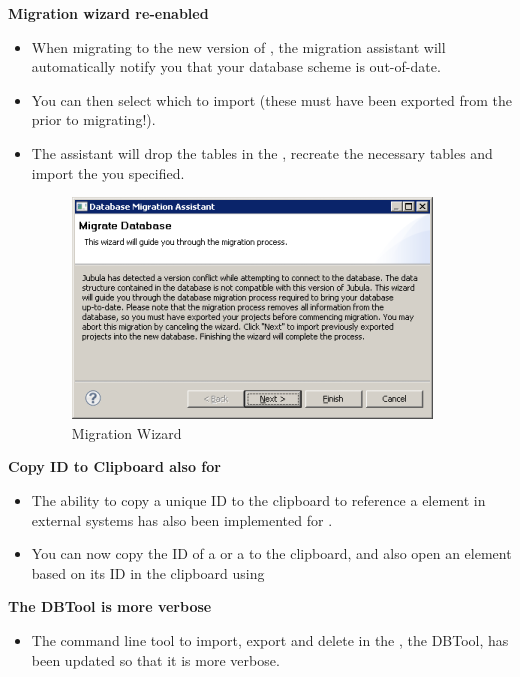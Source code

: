 \textbf{Migration wizard re-enabled}
\begin{itemize}
\item  When migrating to the new version of \app{}, the migration assistant will automatically notify you that your database scheme is out-of-date. 
\item You can then select which \gdprojects{} to import (these must have been exported from the \gddb{} prior to migrating!).
\item The assistant will drop the tables in the \gddb{}, recreate the necessary tables and import the \gdprojects{} you specified.

\begin{figure}[h]
\begin{center}
\includegraphics{52/ps/Migration}
\caption{Migration Wizard}
\label{RNMigration}
\end{center}
\end{figure}

\end{itemize}


\textbf{Copy ID to Clipboard also for \gdsuites{}}
\begin{itemize}
\item The ability to copy a unique ID to the clipboard to reference a \app{} element in external systems has also been implemented for \gdsuites{}. 
\item You can now copy the ID of a \gdcase{} or a \gdsuite{} to the clipboard, and also open an element based on its ID in the clipboard using 
\end{itemize}

\textbf{The DBTool is more verbose}
\begin{itemize}
\item The command line tool to import, export and delete \gdprojects{} in the \gddb{}, the DBTool, has been updated so that it is more verbose.
\end{itemize}

